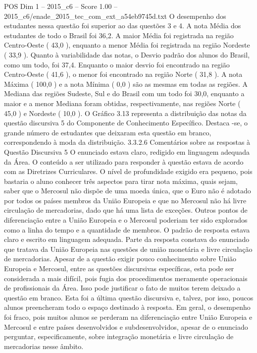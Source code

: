 \begin{textsample}{POS Dim 1 – 2015\_c6 – Score 1.00 – 2015\_c6/enade\_2015\_tec\_com\_ext\_a54eb9745d.txt}
O desempenho dos estudantes nessa questão foi superior ao das questões 3 e 4.
A nota Média dos estudantes de todo o Brasil foi 36,2.
A maior Média foi registrada na região Centro-Oeste ( 43,0 ), enquanto a menor Média foi registrada na região Nordeste ( 33,9 ).
Quanto à variabilidade das notas, o Desvio padrão dos alunos do Brasil, como um todo, foi 37,4.
Enquanto o maior desvio foi encontrado na região Centro-Oeste ( 41,6 ), o menor foi encontrado na região Norte ( 31,8 ).
A nota Máxima ( 100,0 ) e a nota Mínima ( 0,0 ) são as mesmas em todas as regiões.
A Mediana das regiões Sudeste, Sul e do Brasil com um todo foi 30,0, enquanto a maior e a menor Mediana foram obtidas, respectivamente, nas regiões Norte ( 45,0 ) e Nordeste ( 10,0 ).
O Gráfico 3.13 representa a distribuição das notas da questão discursiva 5 do Componente de Conhecimento Específico.
Destaca -se, o grande número de estudantes que deixaram esta questão em branco, correspondendo à moda da distribuição. 3.3.2.6 Comentários sobre as respostas à Questão Discursiva 5 O enunciado estava claro, redigido em linguagem adequada da Área.
O conteúdo a ser utilizado para responder à questão estava de acordo com as Diretrizes Curriculares.
O nível de profundidade exigido era pequeno, pois bastaria o aluno conhecer três aspectos para tirar nota máxima, quais sejam, saber que o Mercosul não dispõe de uma moeda única, que o Euro não é adotado por todos os países membros da União Europeia e que no Mercosul não há livre circulação de mercadorias, dado que há uma lista de exceções.
Outros pontos de diferenciação entre a União Europeia e o Mercosul poderiam ter sido explorados como a linha do tempo e a quantidade de membros.
O padrão de resposta estava claro e escrito em linguagem adequada.
Parte da resposta constava do enunciado que tratava da União Europeia nas questões de união monetária e livre circulação de mercadorias.
Apesar de a questão exigir pouco conhecimento sobre União Europeia e Mercosul, entre as questões discursivas específicas, esta pode ser considerada a mais difícil, pois fugia dos procedimentos meramente operacionais de profissionais da Área.
Isso pode justificar o fato de muitos terem deixado a questão em branco.
Esta foi a última questão discursiva e, talvez, por isso, poucos alunos preencheram todo o espaço destinado à resposta.
Em geral, o desempenho foi fraco, pois muitos alunos se perderam na diferenciação entre União Europeia e Mercosul e entre países desenvolvidos e subdesenvolvidos, apesar de o enunciado perguntar, especificamente, sobre integração monetária e livre circulação de mercadorias nesse âmbito.

\end{textsample}
